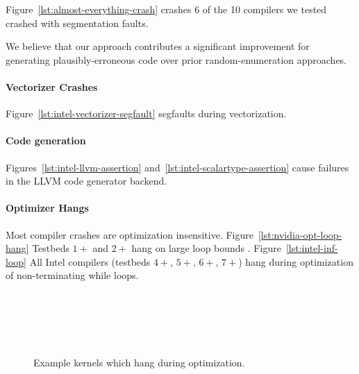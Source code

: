 Figure~\ref{lst:almost-everything-crash} crashes 6 of the 10 compilers we tested crashed with segmentation faults.

We believe that our approach contributes a significant improvement for generating plausibly-erroneous code over prior random-enumeration approaches.

\paragraph{Vectorizer Crashes} Figure~\ref{lst:intel-vectorizer-segfault} segfaults during vectorization. 


\paragraph{Code generation} Figures~\ref{lst:intel-llvm-assertion} and~\ref{lst:intel-scalartype-assertion} cause failures in the LLVM code generator backend.


\paragraph{Optimizer Hangs} Most compiler crashes are optimization insensitive.  Figure~\ref{lst:nvidia-opt-loop-hang} Testbeds $1+$ and $2+$ hang on large loop bounds . Figure~\ref{lst:intel-inf-loop} All Intel compilers (testbeds $4+$, $5+$, $6+$, $7+$) hang during optimization of non-terminating while loops.

\begin{figure}
  \centering %
  \\%
  \\%
  \\%
  \\%
  \caption{Example kernels which hang during optimization.}%
  \label{lst:compiler-hangs}%
\end{figure}


